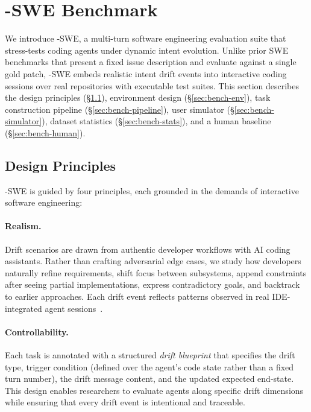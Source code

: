 
\section{\bench{}-SWE Benchmark}
\label{sec:benchmark}

We introduce \bench{}-SWE, a multi-turn software engineering evaluation suite that stress-tests coding agents under dynamic intent evolution. Unlike prior SWE benchmarks that present a fixed issue description and evaluate against a single gold patch, \bench{}-SWE embeds realistic intent drift events into interactive coding sessions over real repositories with executable test suites. This section describes the design principles (\S\ref{sec:bench-principles}), environment design (\S\ref{sec:bench-env}), task construction pipeline (\S\ref{sec:bench-pipeline}), user simulator (\S\ref{sec:bench-simulator}), dataset statistics (\S\ref{sec:bench-stats}), and a human baseline (\S\ref{sec:bench-human}).

\subsection{Design Principles}
\label{sec:bench-principles}

\bench{}-SWE is guided by four principles, each grounded in the demands of interactive software engineering:

\paragraph{Realism.}
Drift scenarios are drawn from authentic developer workflows with AI coding assistants. Rather than crafting adversarial edge cases, we study how developers naturally refine requirements, shift focus between subsystems, append constraints after seeing partial implementations, express contradictory goals, and backtrack to earlier approaches. Each drift event reflects patterns observed in real IDE-integrated agent sessions~\citep{tuna2025, yang2024sweagent}.

\paragraph{Controllability.}
Each task is annotated with a structured \emph{drift blueprint} that specifies the drift type, trigger condition (defined over the agent's code state rather than a fixed turn number), the drift message content, and the updated expected end-state. This design enables researchers to evaluate agents along specific drift dimensions while ensuring that every drift event is intentional and traceable.

